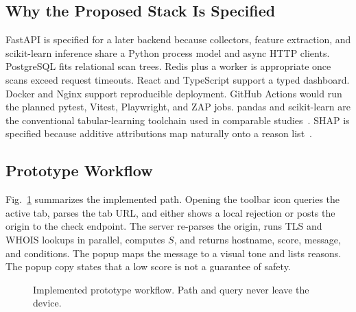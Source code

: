 \documentclass[conference]{IEEEtran}
\begin{document}
\subsection{Why the Proposed Stack Is Specified}
FastAPI is specified for a later backend because collectors, feature extraction, and scikit-learn inference share a Python process model and async HTTP clients. PostgreSQL fits relational scan trees. Redis plus a worker is appropriate once scans exceed request timeouts. React and TypeScript support a typed dashboard. Docker and Nginx support reproducible deployment. GitHub Actions would run the planned pytest, Vitest, Playwright, and ZAP jobs. pandas and scikit-learn are the conventional tabular-learning toolchain used in comparable studies~\cite{sahingoz2019ml,hannousse2021benchmark}. SHAP is specified because additive attributions map naturally onto a reason list~\cite{lundberg2017shap}.

\subsection{Prototype Workflow}
Fig.~\ref{fig:flow} summarizes the implemented path. Opening the toolbar icon queries the active tab, parses the tab URL, and either shows a local rejection or posts the origin to the check endpoint. The server re-parses the origin, runs TLS and WHOIS lookups in parallel, computes $S$, and returns hostname, score, message, and conditions. The popup maps the message to a visual tone and lists reasons. The popup copy states that a low score is not a guarantee of safety.

\begin{figure}[!t]
\centering
{}
\caption{Implemented prototype workflow. Path and query never leave the device.}
\label{fig:flow}
\end{figure}
\end{document}
